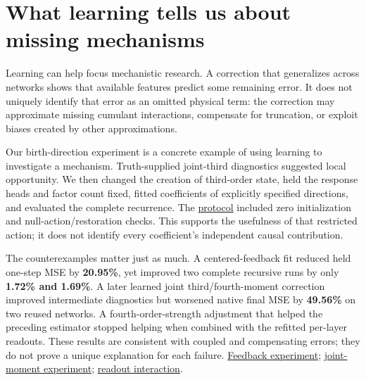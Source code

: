 \documentclass[11pt,letterpaper]{article}
\begin{document}
\section{What learning tells us about missing mechanisms}\label{what-learning-tells-us-about-missing-mechanisms}

Learning can help focus mechanistic research. A correction that generalizes across networks shows that available features predict some remaining error. It does not uniquely identify that error as an omitted physical term: the correction may approximate missing cumulant interactions, compensate for truncation, or exploit biases created by other approximations.

Our birth-direction experiment is a concrete example of using learning to investigate a mechanism. Truth-supplied joint-third diagnostics suggested local opportunity. We then changed the creation of third-order state, held the response heads and factor count fixed, fitted coefficients of explicitly specified directions, and evaluated the complete recurrence. The \href{https://github.com/mattliston/arc-whitebox-estimation-challenge/blob/main/experiments/birth-terms/four-fitted-birth-directions-pass-native40-independent14-adjusted-ratios/PROTOCOL.md}{protocol} included zero initialization and null-action/restoration checks. This supports the usefulness of that restricted action; it does not identify every coefficient's independent causal contribution.

The counterexamples matter just as much. A centered-feedback fit reduced held one-step MSE by \textbf{20.95\%}, yet improved two complete recursive runs by only \textbf{1.72\% and 1.69\%}. A later learned joint third/fourth-moment correction improved intermediate diagnostics but worsened native final MSE by \textbf{49.56\%} on two reused networks. A fourth-order-strength adjustment that helped the preceding estimator stopped helping when combined with the refitted per-layer readouts. These results are consistent with coupled and compensating errors; they do not prove a unique explanation for each failure. \href{https://github.com/mattliston/arc-whitebox-estimation-challenge/tree/main/experiments/learned-correction/centered-feedback-convention-closed-after-matched-closed-loop-test/}{Feedback experiment}; \href{https://github.com/mattliston/arc-whitebox-estimation-challenge/tree/main/experiments/learned-correction/frozen-joint-third-fourth-moment-correction-worsens-native-adjusted/}{joint-moment experiment}; \href{https://github.com/mattliston/arc-whitebox-estimation-challenge/tree/main/experiments/dials/fourth-cumulant-strength-gains-base-estimator-disappear-fitted-readout/}{readout interaction}.
\end{document}
